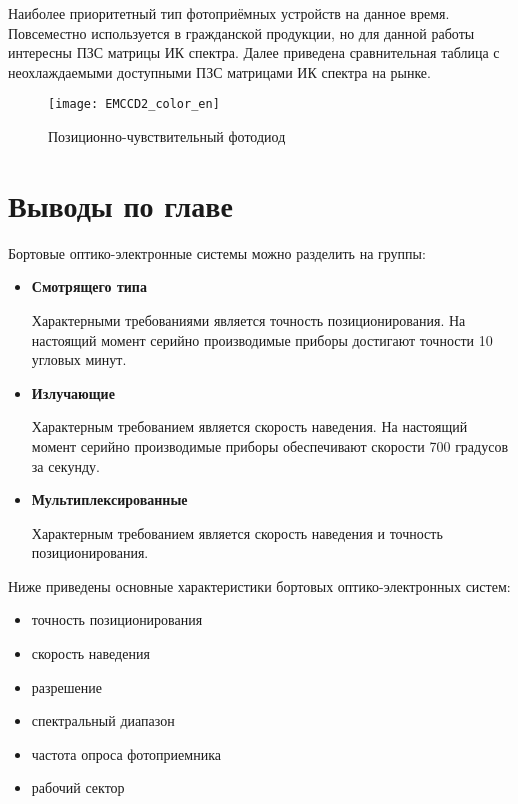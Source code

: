 \begin{itemize}
	Наиболее приоритетный тип фотоприёмных устройств на данное время. Повсеместно используется в гражданской продукции, но для данной работы интересны ПЗС матрицы ИК спектра. Далее приведена сравнительная таблица с неохлаждаемыми доступными ПЗС матрицами ИК спектра на рынке.
	
	\begin{figure}[ht]
		\centering
		\texttt{[image: EMCCD2\_color\_en]} 
		\caption{Позиционно-чувствительный фотодиод \cite[]{CCD2}}
		\label{fig:EMCCD2_color_en}
	\end{figure}
	
\end{itemize}


\section{Выводы по главе} \label{sec:ch1/sec4-}

Бортовые оптико-электронные системы можно разделить на группы:
\begin{itemize}
	\item \textbf{Смотрящего типа}
	
	Характерными требованиями является точность позиционирования. На настоящий момент серийно производимые приборы достигают точности 10 угловых минут.
	
		
	\item \textbf{Излучающие}
	
	Характерным требованием является скорость наведения. На настоящий момент серийно производимые приборы обеспечивают скорости 700 градусов за секунду.
	
	\item \textbf{Мультиплексированные}
	
	Характерным требованием является скорость наведения и точность позиционирования.
	
\end{itemize}

Ниже приведены основные характеристики бортовых оптико-электронных систем: 
\begin{itemize}
\item точность позиционирования  
\item скорость наведения
\item разрешение 
\item спектральный диапазон
\item частота опроса фотоприемника
\item рабочий сектор
\end{itemize}

